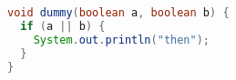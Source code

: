 \begin{lstlisting}[language=Java]
void dummy(boolean a, boolean b) {
  if (a || b) {
    System.out.println("then");
  }
}
\end{lstlisting}
